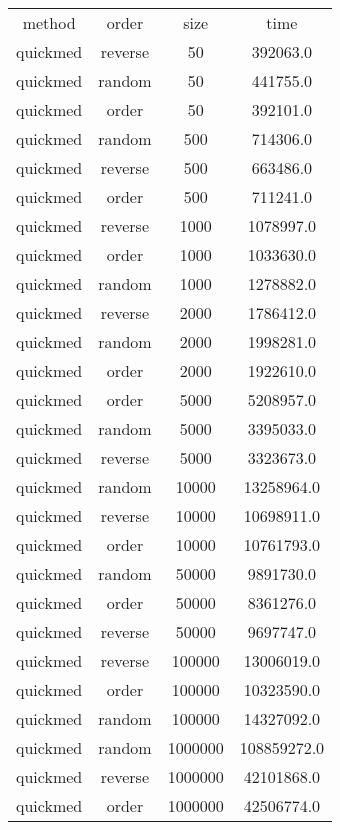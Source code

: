 \begin{table}
\begin{tabular}{cccc}
method & order & size & time \\
quickmed & reverse & 50 & 392063.0 \\
quickmed & random & 50 & 441755.0 \\
quickmed & order & 50 & 392101.0 \\
quickmed & random & 500 & 714306.0 \\
quickmed & reverse & 500 & 663486.0 \\
quickmed & order & 500 & 711241.0 \\
quickmed & reverse & 1000 & 1078997.0 \\
quickmed & order & 1000 & 1033630.0 \\
quickmed & random & 1000 & 1278882.0 \\
quickmed & reverse & 2000 & 1786412.0 \\
quickmed & random & 2000 & 1998281.0 \\
quickmed & order & 2000 & 1922610.0 \\
quickmed & order & 5000 & 5208957.0 \\
quickmed & random & 5000 & 3395033.0 \\
quickmed & reverse & 5000 & 3323673.0 \\
quickmed & random & 10000 & 13258964.0 \\
quickmed & reverse & 10000 & 10698911.0 \\
quickmed & order & 10000 & 10761793.0 \\
quickmed & random & 50000 & 9891730.0 \\
quickmed & order & 50000 & 8361276.0 \\
quickmed & reverse & 50000 & 9697747.0 \\
quickmed & reverse & 100000 & 13006019.0 \\
quickmed & order & 100000 & 10323590.0 \\
quickmed & random & 100000 & 14327092.0 \\
quickmed & random & 1000000 & 108859272.0 \\
quickmed & reverse & 1000000 & 42101868.0 \\
quickmed & order & 1000000 & 42506774.0 \\
\end{tabular}
\end{table}
